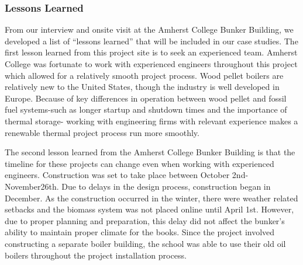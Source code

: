 \subsubsection{Lessons Learned}
\par From our interview and onsite visit at the Amherst College Bunker Building, we developed a list of “lessons learned” that will be included in our case studies. The first lesson learned from this project site is to seek an experienced team. Amherst College was fortunate to work with experienced engineers throughout this project which allowed for a relatively smooth project process. Wood pellet boilers are relatively new to the United States, though the industry is well developed in Europe. Because of key differences in operation between wood pellet and fossil fuel systems-such as longer startup and shutdown times and the importance of thermal storage- working with engineering firms with relevant experience makes a renewable thermal project process run more smoothly.
\par The second lesson learned from the Amherst College Bunker Building is that the timeline for these projects can change even when working with experienced engineers. Construction was set to take place between October 2nd-November26th. Due to delays in the design process, construction began in December. As the construction occurred in the winter, there were weather related setbacks and the biomass system was not placed online until April 1st. However, due to proper planning and preparation, this delay did not affect the bunker’s ability to maintain proper climate for the books. Since the project involved constructing a separate boiler building, the school was able to use their old oil boilers throughout the project installation process.

